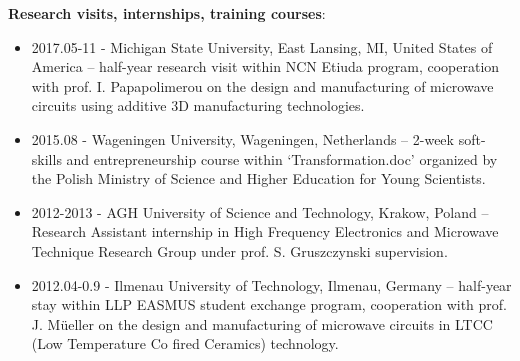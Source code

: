 \noindent \textbf{Research visits, internships, training courses}:
\begin{itemize}[nosep]
\item 2017.05-11 - Michigan State University, East Lansing, MI, United States of America – half-year research visit within NCN Etiuda program, cooperation with prof. I. Papapolimerou on the design and manufacturing of microwave circuits using additive 3D manufacturing technologies.
\item 2015.08 - Wageningen University, Wageningen, Netherlands – 2-week soft-skills and entrepreneurship course within ‘Transformation.doc’ organized by the Polish Ministry of Science and Higher Education for Young Scientists.
\item 2012-2013 - AGH University of Science and Technology, Krakow, Poland – Research Assistant internship in High Frequency Electronics and Microwave Technique Research Group under prof. S. Gruszczynski supervision.
\item 2012.04-0.9 - Ilmenau University of Technology, Ilmenau, Germany – half-year stay within LLP EASMUS student exchange program, cooperation with prof. J. Müeller on the design and manufacturing of microwave circuits in LTCC (Low Temperature Co fired Ceramics) technology.
\end{itemize}
\vspace*{1cm} %

